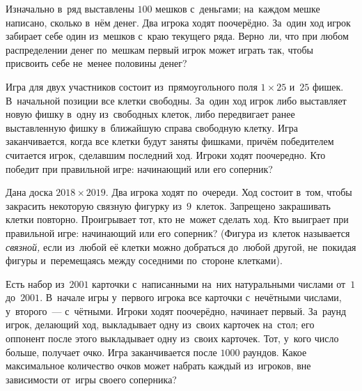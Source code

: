 


\begin{problems}

\item
Изначально в~ряд выставлены $100$ мешков с~деньгами;
на~каждом мешке написано, сколько в~нём денег.
Два игрока ходят поочерёдно.
За~один ход игрок забирает себе один из~мешков с~краю текущего ряда.
Верно~ли, что при любом распределении денег по~мешкам первый игрок может играть
так, чтобы присвоить себе не~менее половины денег?


\item
Игра для двух участников состоит из~прямоугольного поля $1 \times 25$ и~$25$
фишек.
В~начальной позиции все клетки свободны.
За~один ход игрок либо выставляет новую фишку в~одну из~свободных клеток, либо
передвигает ранее выставленную фишку в~ближайшую справа свободную клетку.
Игра заканчивается, когда все клетки будут заняты фишками, причём победителем
считается игрок, сделавшим последний ход.
Игроки ходят поочередно.
Кто победит при правильной игре: начинающий или его соперник?

\item
Дана доска $2018 \times 2019$.
Два игрока ходят по~очереди.
Ход состоит в~том, чтобы закрасить некоторую связную фигурку из~$9$~клеток.
Запрещено закрашивать клетки повторно.
Проигрывает тот, кто не~может сделать ход.
Кто выиграет при правильной игре: начинающий или его соперник?
(Фигура из~клеток называется \emph{связной,} если из~любой её клетки можно
добраться до~любой другой, не~покидая фигуры и~перемещаясь между соседними
по~стороне клетками).

\item
Есть набор из~$2001$ карточки с~написанными на~них натуральными числами
от~$1$ до~$2001$.
В~начале игры у~первого игрока все карточки с~нечётными числами,
у~второго~--- с~чётными.
Игроки ходят поочерёдно, начинает первый.
За~раунд игрок, делающий ход, выкладывает одну из~своих карточек на~стол;
его оппонент после этого выкладывает одну из~своих карточек.
Тот, у~кого число больше, получает очко.
Игра заканчивается после $1000$ раундов.
Какое максимальное количество очков может набрать каждый из~игроков, вне
зависимости от~игры своего соперника?

\end{problems}

